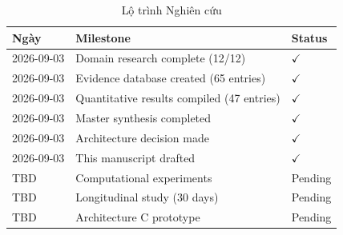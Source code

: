 \documentclass[10pt,leqno]{amsart}
\begin{document}
\begin{table}[H]
\centering
\caption{Lộ trình Nghiên cứu}
\label{tab:timeline}
\begin{tabular}{lll}
\toprule
\textbf{Ngày} & \textbf{Milestone} & \textbf{Status} \\
\midrule
2026-09-03 & Domain research complete (12/12) & $\checkmark$ \\
2026-09-03 & Evidence database created (65 entries) & $\checkmark$ \\
2026-09-03 & Quantitative results compiled (47 entries) & $\checkmark$ \\
2026-09-03 & Master synthesis completed & $\checkmark$ \\
2026-09-03 & Architecture decision made & $\checkmark$ \\
2026-09-03 & This manuscript drafted & $\checkmark$ \\
TBD & Computational experiments & Pending \\
TBD & Longitudinal study (30 days) & Pending \\
TBD & Architecture C prototype & Pending \\
\bottomrule
\end{tabular}
\end{table}
\end{document}
